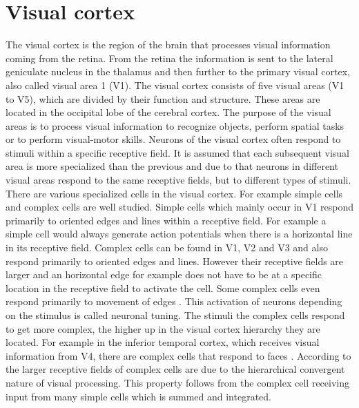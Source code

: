 \section{Visual cortex}

The visual cortex is the region of the brain that processes visual information coming from the retina. From the retina the information is sent to the lateral geniculate nucleus in the thalamus and then further to the primary visual cortex, also called visual area 1 (V1). The visual cortex consists of five visual areas (V1 to V5), which are divided by their function and structure. These areas are located in the occipital lobe of the cerebral cortex. The purpose of the visual areas is to process visual information to recognize objects, perform spatial tasks or to perform  visual-motor skills. Neurons of the visual cortex often respond to stimuli within a specific receptive field. It is assumed that each subsequent visual area is more specialized than the previous and due to that neurons in different visual areas respond to the same receptive fields, but to different types of stimuli. There are various specialized cells in the visual cortex. For example simple cells and complex cells are well studied. Simple cells which mainly occur in V1 respond primarily to oriented edges and lines within a receptive field. For example a simple cell would always generate action potentials when there is a horizontal line in its receptive field. Complex cells can be found in V1, V2 and V3 and also respond primarily to oriented edges and lines. However their receptive fields are larger and an horizontal edge for example does not have to be at a specific location in the receptive field to activate the cell. Some complex cells even respond primarily to movement of edges \citep{visualCortexBook}.
This activation of neurons depending on the stimulus is called neuronal tuning. The stimuli the complex cells respond to get more complex, the higher up in the visual cortex hierarchy they are located. For example in the inferior temporal cortex, which receives visual information from V4, there are complex cells that respond to faces \citep{complexCellsFaces}.
According to \citet{complexCellsIntegrated} the larger receptive fields of complex cells are due to the hierarchical convergent nature of visual processing. This property follows from the complex cell receiving input from many simple cells which is summed and integrated.


